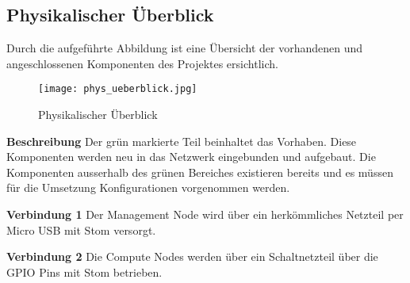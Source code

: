 \subsection{Physikalischer Überblick}
Durch die aufgeführte Abbildung ist eine Übersicht der vorhandenen und angeschlossenen Komponenten des Projektes ersichtlich.

\begin{figure}[htb]
\centering
\texttt{[image: phys\_ueberblick.jpg]}
\caption{Physikalischer Überblick}
\label{fig:Physikalischer Überblick}
\end{figure} 

\textbf{Beschreibung}\newline
Der grün markierte Teil beinhaltet das Vorhaben. Diese Komponenten werden neu in das Netzwerk eingebunden und aufgebaut. Die Komponenten ausserhalb des grünen Bereiches existieren bereits und es müssen für die Umsetzung Konfigurationen vorgenommen werden.

\textbf{Verbindung 1} \newline
Der Management Node wird über ein herkömmliches Netzteil per Micro USB mit Stom versorgt.

\textbf{Verbindung 2} \newline
Die Compute Nodes werden über ein Schaltnetzteil über die GPIO Pins mit Stom betrieben.


